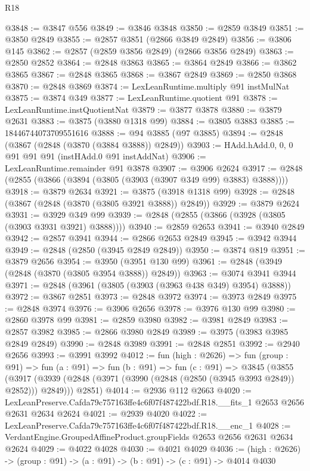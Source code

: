 \begin{lexlean}{R18}
\begin{coremodule}
@3848 := @3847 @556
@3849 := @3846 @3848
@3850 := @2859 @3849
@3851 := @3850 @2849
@3855 := @2857 @3851 (@2866 @3849 @2849)
@3856 := @3806 @145
@3862 := @2857 (@2859 @3856 @2849) (@2866 @3856 @2849)
@3863 := @2850 @2852
@3864 := @2848 @3863
@3865 := @3864 @2849
@3866 := @3862 @3865
@3867 := @2848 @3865
@3868 := @3867 @2849
@3869 := @2850 @3868
@3870 := @2848 @3869
@3874 := LexLeanRuntime.multiply @91 instMulNat
@3875 := @3874 @349
@3877 := LexLeanRuntime.quotient @91
@3878 := LexLeanRuntime.instQuotientNat
@3879 := @3877 @3878
@3880 := @3879 @2631
@3883 := @3875 (@3880 @1318 @99)
@3884 := @3805 @3883
@3885 := 18446744073709551616
@3888 := @94 @3885 (@97 @3885)
@3894 := @2848 (@3867 (@2848 (@3870 (@3884 @3888)) @2849))
@3903 := HAdd.hAdd.{0, 0, 0} @91 @91 @91 (instHAdd.{0} @91 instAddNat)
@3906 := LexLeanRuntime.remainder @91 @3878
@3907 := @3906 @2624
@3917 := @2848 (@2855 (@3866 (@3894 (@3805 (@3903 (@3907 @349 @99) @3883) @3888))))
@3918 := @3879 @2634
@3921 := @3875 (@3918 @1318 @99)
@3928 := @2848 (@3867 (@2848 (@3870 (@3805 @3921 @3888)) @2849))
@3929 := @3879 @2624
@3931 := @3929 @349 @99
@3939 := @2848 (@2855 (@3866 (@3928 (@3805 (@3903 @3931 @3921) @3888))))
@3940 := @2859 @2653
@3941 := @3940 @2849
@3942 := @2857 @3941
@3944 := @2866 @2653 @2849
@3945 := @3942 @3944
@3949 := @2848 (@2850 (@3945 @2849 @2849))
@3950 := @3874 @819
@3951 := @3879 @2656
@3954 := @3950 (@3951 @130 @99)
@3961 := @2848 (@3949 (@2848 (@3870 (@3805 @3954 @3888)) @2849))
@3963 := @3074 @3941 @3944
@3971 := @2848 (@3961 (@3805 (@3903 (@3963 @438 @349) @3954) @3888))
@3972 := @3867 @2851
@3973 := @2848 @3972
@3974 := @3973 @2849
@3975 := @2848 @3974
@3976 := @3906 @2656
@3978 := @3976 @130 @99
@3980 := @2860 @3978 @99
@3981 := @2859 @3980
@3982 := @3981 @2849
@3983 := @2857 @3982
@3985 := @2866 @3980 @2849
@3989 := @3975 (@3983 @3985 @2849 @2849)
@3990 := @2848 @3989
@3991 := @2848 @2851
@3992 := @2940 @2656
@3993 := @3991 @3992
@4012 := fun (high : @2626) =>
  fun (group : @91) =>
  fun (a : @91) =>
  fun (b : @91) =>
  fun (c : @91) =>
  @3845
    (@3855
      (@3917 (@3939 (@2848 (@3971 (@3990 (@2848 (@2850 (@3945 @3993 @2849)) @2852))) @2849)))
      @2851)
@4014 := @2936 @112 @2663
@4020 := LexLeanPreserve.Cafda79c757163ffe4c6f07f487422bdf.R18.__fits_1
    @2653
    @2656
    @2631
    @2634
    @2624
@4021 := @2939 @4020
@4022 := LexLeanPreserve.Cafda79c757163ffe4c6f07f487422bdf.R18.__enc_1
@4028 := VerdantEngine.GroupedAffineProduct.groupFields @2653 @2656 @2631 @2634 @2624
@4029 := @4022 @4028
@4030 := @4021 @4029
@4036 := (high : @2626) -> (group : @91) -> (a : @91) -> (b : @91) -> (c : @91) -> @4014 @4030

\end{coremodule}
\end{lexlean}
